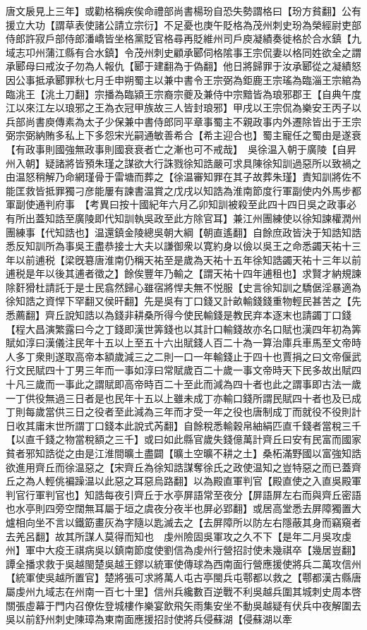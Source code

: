 唐文扆見上三年】或勸格稱疾俟命禮部尚書楊玢自恐失勢謂格曰【玢方貧翻】公有援立大功【謂草表使諸公請立宗衍】不足憂也庚午貶格為茂州刺史玢為榮經尉吏部侍郎許寂戶部侍郎潘嶠皆坐格黨貶官格尋再貶維州司戶庾凝績奏徙格於合水鎮【九域志卭州蒲江縣有合水鎮】令茂州刺史顧承郾伺格隂事王宗侃妻以格同姓欲全之謂承郾母曰戒汝子勿為人報仇【郾于建翻為于偽翻】他日將歸罪于汝承郾從之凝績怒因公事抵承郾罪秋七月壬申朔蜀主以兼中書令王宗弼為鉅鹿王宗瑤為臨淄王宗綰為臨洮王【洮土刀翻】宗播為臨潁王宗裔宗夔及兼侍中宗黯皆為琅邪郡王【自典午度江以來江左以琅邪之王為衣冠甲族故三人皆封琅邪】甲戌以王宗侃為樂安王丙子以兵部尚書庾傳素為太子少保兼中書侍郎同平章事蜀主不親政事内外遷除皆出于王宗弼宗弼納賄多私上下多怨宋光嗣通敏善希合【希主迎合也】蜀主寵任之蜀由是遂衰【有政事則國強無政事則國衰衰者亡之漸也可不戒哉】　吳徐温入朝于廣陵【自昇州入朝】疑諸將皆預朱瑾之謀欲大行誅戮徐知誥嚴可求具陳徐知訓過惡所以致禍之由温怒稍解乃命網瑾骨于雷塘而葬之【徐温審知罪在其子故葬朱瑾】責知訓將佐不能匡救皆抵罪獨刁彦能屢有諫書温賞之戊戌以知誥為淮南節度行軍副使内外馬步都軍副使通判府事　【考異曰按十國紀年六月乙卯知訓被殺至此四十四日吳之政事必有所出蓋知誥至廣陵即代知訓執吳政至此方除官耳】兼江州團練使以徐知諫權潤州團練事【代知誥也】温還鎮金陵總吳朝大綱【朝直遙翻】自餘庶政皆決于知誥知誥悉反知訓所為事吳王盡恭接士大夫以謙御衆以寛約身以儉以吳王之命悉蠲天祐十三年以前逋税【梁旣簒唐淮南仍稱天祐至是歲為天祐十五年徐知誥蠲天祐十三年以前逋税是年以後其逋者徵之】餘俟豐年乃輸之【謂天祐十四年逋租也】求賢才納規諫除姧猾杜請託于是士民翕然歸心雖宿將悍夫無不悦服【史言徐知訓之驕倨淫暴適為徐知誥之資悍下罕翻又侯旰翻】先是吳有丁口錢又計畝輸錢錢重物輕民甚苦之【先悉薦翻】齊丘說知誥以為錢非耕桑所得今使民輸錢是教民弃本逐末也請蠲丁口錢【程大昌演繁露曰今之丁錢即漢世筭錢也以其計口輸錢故亦名口賦也漢四年初為筭賦如淳曰漢儀注民年十五以上至五十六出賦錢人百二十為一算治庫兵車馬至文帝時人多丁衆則遂取高帝本額歲減三之二則一口一年輸錢止于四十也賈捐之曰文帝偃武行文民賦四十丁男三年而一事如淳曰常賦歲百二十歲一事文帝時天下民多故出賦四十凡三歲而一事此之謂賦即高帝時百二十至此而減為四十者也此之謂事即古法一歲一丁供役無過三日者是也民年十五以上雖未成丁亦輸口錢所謂民賦四十者也及已成丁則每歲當供三日之役者至此減為三年而才受一年之役也唐制成丁而就役不役則計日收其庸末世所謂丁口錢本此說式芮翻】自餘稅悉輸穀帛紬絹匹直千錢者當稅三千【以直千錢之物當稅額之三千】或曰如此縣官歲失錢億萬計齊丘曰安有民富而國家貧者邪知誥從之由是江淮間曠土盡闢【曠土空曠不耕之土】桑柘滿野國以富強知誥欲進用齊丘而徐温惡之【宋齊丘為徐知誥謀奪徐氏之政使温知之豈特惡之而已蓋齊丘之為人輕佻褊躁温以此惡之耳惡烏路翻】以為殿直軍判官【殿直使之入直吳殿軍判官行軍判官也】知誥每夜引齊丘于水亭屏語常至夜分【屏語屏左右而與齊丘密語也水亭則四旁空闊無耳屬于垣之虞夜分夜半也屏必郢翻】或居高堂悉去屏障獨置大爐相向坐不言以鐵筯畫灰為字隨以匙滅去之【去屏障所以防左右隱蔽其身而竊窺者去羌呂翻】故其所謀人莫得而知也　虔州險固吳軍攻之久不下【是年二月吳攻虔州】軍中大疫王祺病吳以鎮南節度使劉信為虔州行營招討使未幾祺卒【幾居豈翻】譚全播求救于吳越閩楚吳越王鏐以統軍使傳球為西南面行營應援使將兵二萬攻信州【統軍使吳越所置官】楚將張可求將萬人屯古亭閩兵屯鄠都以救之【鄠都漢古縣唐屬虔州九域志在州南一百七十里】信州兵纔數百逆戰不利吳越兵圍其城刺史周本啓關張虛幕于門内召僚佐登城樓作樂宴飲飛矢雨集安坐不動吳越疑有伏兵中夜解圍去吳以前舒州刺史陳璋為東南面應援招討使將兵侵蘇湖【侵蘇湖以牽